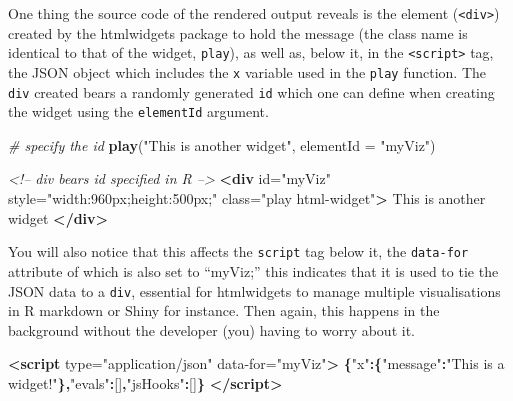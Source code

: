 \documentclass[10pt,]{krantz}
\makeatletter
\newenvironment{Shaded}{\begin{snugshade}}{\end{snugshade}}
\newcommand{\CommentTok}[1]{\textcolor[rgb]{0.37,0.37,0.37}{\textit{#1}}}
\newcommand{\DataTypeTok}[1]{\textcolor[rgb]{0.27,0.27,0.27}{#1}}
\newcommand{\KeywordTok}[1]{\textcolor[rgb]{0.27,0.27,0.27}{\textbf{#1}}}
\newcommand{\NormalTok}[1]{#1}
\newcommand{\OperatorTok}[1]{\textcolor[rgb]{0.43,0.43,0.43}{\textbf{#1}}}
\newcommand{\OtherTok}[1]{\textcolor[rgb]{0.37,0.37,0.37}{#1}}
\newcommand{\StringTok}[1]{\textcolor[rgb]{0.5,0.5,0.5}{#1}}
\newenvironment{kframe}{%
\medskip{}
\setlength{\fboxsep}{.8em}
 \def\at@end@of@kframe{}%
 \ifinner\ifhmode%
  \def\at@end@of@kframe{\end{minipage}}%
  \begin{minipage}{\columnwidth}%
 \fi\fi%
 \def\FrameCommand##1{\hskip\@totalleftmargin \hskip-\fboxsep
 \colorbox{shadecolor}{##1}\hskip-\fboxsep
     \hskip-\linewidth \hskip-\@totalleftmargin \hskip\columnwidth}%
 \MakeFramed {\advance\hsize-\width
   \@totalleftmargin\z@ \linewidth\hsize
   \@setminipage}}%
 {\par\unskip\endMakeFramed%
 \at@end@of@kframe}
\renewenvironment{Shaded}{\begin{kframe}}{\end{kframe}}
\makeatother
\begin{document}
One thing the source code of the rendered output reveals is the element (\texttt{\textless{}div\textgreater{}}) created by the htmlwidgets package to hold the message (the class name is identical to that of the widget, \texttt{play}), as well as, below it, in the \texttt{\textless{}script\textgreater{}} tag, the JSON object which includes the \texttt{x} variable used in the \texttt{play} function. The \texttt{div} created bears a randomly generated \texttt{id} which one can define when creating the widget using the \texttt{elementId} argument.

\begin{Shaded}
\begin{Highlighting}[]
\CommentTok{# specify the id}
\KeywordTok{play}\NormalTok{(}\StringTok{"This is another widget"}\NormalTok{, }\DataTypeTok{elementId =} \StringTok{"myViz"}\NormalTok{)}
\end{Highlighting}
\end{Shaded}

\begin{Shaded}
\begin{Highlighting}[]
\CommentTok{<!-- div bears id specified in R -->}
\KeywordTok{<div}\OtherTok{ id=}\StringTok{"myViz"} 
\OtherTok{  style=}\StringTok{"width:960px;height:500px;"} 
\OtherTok{  class=}\StringTok{"play html-widget"}\KeywordTok{>}
\NormalTok{  This is another widget}
\KeywordTok{</div>}
\end{Highlighting}
\end{Shaded}

You will also notice that this affects the \texttt{script} tag below it, the \texttt{data-for} attribute of which is also set to ``myViz;'' this indicates that it is used to tie the JSON data to a \texttt{div}, essential for htmlwidgets to manage multiple visualisations in R markdown or Shiny for instance. Then again, this happens in the background without the developer (you) having to worry about it.

\begin{Shaded}
\begin{Highlighting}[]
\KeywordTok{<script}\OtherTok{ type=}\StringTok{"application/json"} 
\OtherTok{  data-for=}\StringTok{"myViz"}\KeywordTok{>}
  \OperatorTok{\{}\StringTok{"x"}\OperatorTok{:\{}\StringTok{"message"}\OperatorTok{:}\StringTok{"This is a widget!"}\OperatorTok{\},}\StringTok{"evals"}\OperatorTok{:}\NormalTok{[]}\OperatorTok{,}\StringTok{"jsHooks"}\OperatorTok{:}\NormalTok{[]}\OperatorTok{\}}
\KeywordTok{</script>}
\end{Highlighting}
\end{Shaded}
\end{document}
